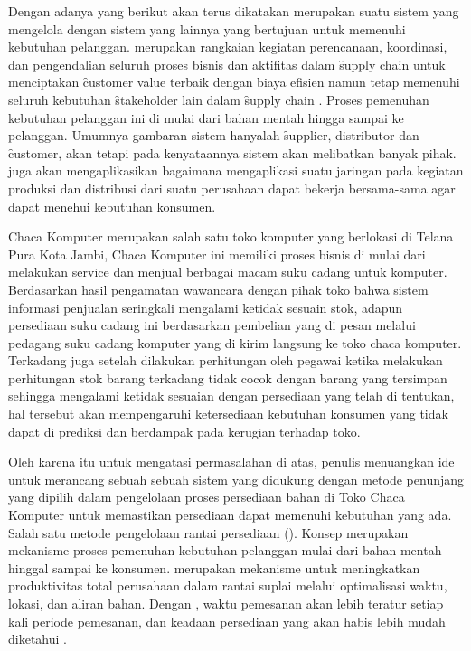 Dengan adanya \SCM yang berikut akan terus dikatakan \scm merupakan suatu sistem yang mengelola dengan sistem yang lainnya yang bertujuan untuk memenuhi kebutuhan pelanggan. \scm merupakan rangkaian kegiatan perencanaan, koordinasi, dan pengendalian seluruh proses bisnis dan aktifitas dalam \f{supply chain} untuk menciptakan \f{customer value} terbaik dengan biaya efisien namun tetap memenuhi seluruh kebutuhan \f{stakeholder} lain dalam \f{supply chain} \cite{Ibrahim, Hilman2013}. Proses pemenuhan kebutuhan pelanggan ini di mulai dari bahan mentah hingga sampai ke pelanggan. Umumnya gambaran sistem \scm hanyalah \f{supplier}, distributor dan \f{customer}, akan tetapi pada kenyataannya sistem \scm akan melibatkan banyak pihak. \scm juga akan mengaplikasikan bagaimana mengaplikasi suatu jaringan pada kegiatan produksi dan distribusi dari suatu perusahaan dapat bekerja bersama-sama agar dapat menehui kebutuhan konsumen.

Chaca Komputer merupakan salah satu toko komputer yang berlokasi di Telana Pura Kota Jambi, Chaca Komputer ini memiliki proses bisnis di mulai dari melakukan service dan menjual berbagai macam suku cadang untuk komputer. Berdasarkan hasil pengamatan wawancara dengan pihak toko bahwa sistem informasi penjualan seringkali mengalami ketidak sesuain stok, adapun persediaan suku cadang ini berdasarkan pembelian yang di pesan melalui pedagang suku cadang komputer yang di kirim langsung ke toko chaca komputer. Terkadang juga setelah dilakukan perhitungan oleh pegawai ketika melakukan perhitungan stok barang terkadang tidak cocok dengan barang yang tersimpan  sehingga mengalami ketidak sesuaian dengan persediaan yang telah di tentukan, hal tersebut akan mempengaruhi ketersediaan kebutuhan konsumen yang tidak dapat di prediksi dan berdampak pada kerugian terhadap toko.

Oleh karena itu untuk mengatasi permasalahan di atas, penulis menuangkan ide untuk merancang sebuah sebuah sistem yang didukung dengan metode penunjang yang dipilih dalam pengelolaan proses persediaan bahan di Toko Chaca Komputer untuk memastikan persediaan dapat memenuhi kebutuhan yang ada. Salah satu metode pengelolaan rantai persediaan (\SCM). Konsep \scm merupakan mekanisme proses pemenuhan kebutuhan pelanggan mulai dari bahan mentah hinggal sampai ke konsumen. \scm merupakan mekanisme untuk meningkatkan produktivitas total perusahaan dalam rantai suplai melalui optimalisasi waktu, lokasi, dan aliran bahan. Dengan \scm, waktu pemesanan akan lebih teratur setiap kali periode pemesanan, dan keadaan persediaan yang akan habis lebih mudah diketahui \cite{Ibrahim}.


